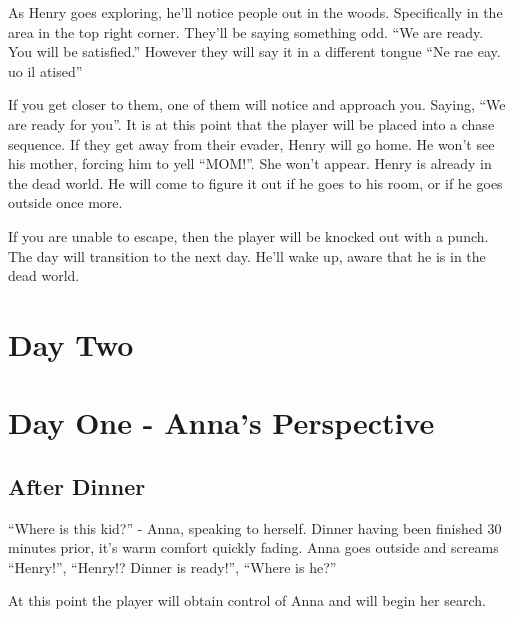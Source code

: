 \documentclass[12pt, a4paper, titlepage]{article}
\begin{document}
            As Henry goes exploring, he'll notice people out in the woods. Specifically in the area in the top right corner. They'll be saying something odd. ``We are ready. You will be 			   satisfied.'' However they will say it in a different tongue ``Ne rae eay. uo il atised''
            
            If you get closer to them, one of them will notice and approach you. Saying, ``We are ready for you''. It is at this point that the player will be placed into a chase sequence. If they 
            get away from their evader, Henry will go home. He won't see his mother, forcing him to yell ``MOM!''. She won't appear. Henry is already in the dead world. He will come to figure 	it out if he goes to his room, or if he goes outside once more.
            
            If you are unable to escape, then the player will be knocked out with a punch. The day will transition to the next day. He'll wake up, aware that he is in the dead world.
            
    \section{Day Two}
    
    
    \section{Day One - Anna's Perspective}
    
    	\subsection{After Dinner}
		
		``Where is this kid?'' - Anna, speaking to herself. Dinner having been finished 30 minutes prior, it's warm comfort quickly fading.
		Anna goes outside and screams ``Henry!'', ``Henry!? Dinner is ready!'', ``Where is he?''
		
		At this point the player will obtain control of Anna and will begin her search.
\end{document}
